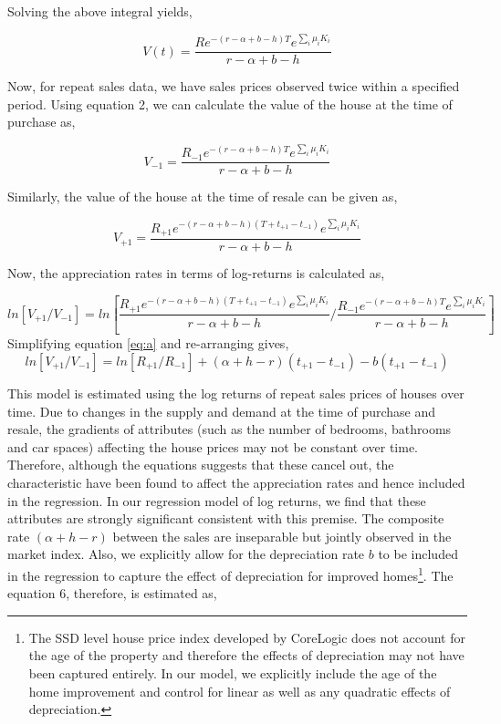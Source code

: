 \documentclass[AEJ,reqno, draftmode]{AEA} %
\begin{document}
Solving the above integral yields,

\begin{equation}
    V(t) = \frac{R e^{-(r-\alpha+b-h)T} e^{\sum_{i} \mu_i K_i}}{r-\alpha+b-h}
\end{equation}

Now, for repeat sales data, we have sales prices observed twice within a specified period. Using equation 2, we can calculate the value of the house at the time of purchase as,

\begin{equation}
    V_{-1} = \frac{R_{-1} e^{-(r-\alpha+b-h)T} e^{\sum_{i} \mu_i K_i}}{r-\alpha+b-h}
\end{equation}

Similarly, the value of the house at the time of resale can be given as,

\begin{equation}
    V_{+1} = \frac{R_{+1} e^{-(r-\alpha+b-h)(T+t_{+1}-t_{-1})} e^{\sum_{i} \mu_i K_i}}{r-\alpha+b-h}
\end{equation}

Now, the appreciation rates in terms of log-returns is calculated as,

\begin{equation} \label{eq:a}
    ln [V_{+1}/V_{-1}] = ln [\frac{R_{+1} e^{-(r-\alpha+b-h)(T+t_{+1}-t_{-1})} e^{\sum_{i} \mu_i K_i}}{r-\alpha+b-h} / \frac{R_{-1} e^{-(r-\alpha+b-h)T} e^{\sum_{i} \mu_i K_i}}{r-\alpha+b-h}]
\end{equation}
Simplifying equation \ref{eq:a} and re-arranging gives,
\begin{equation}
    ln [V_{+1}/V_{-1}] = ln [R_{+1}/R_{-1}] + (\alpha+h-r)(t_{+1}-t_{-1}) - b(t_{+1}-t_{-1}) 
\end{equation}

This model is estimated using the log returns of repeat sales prices of houses over time. Due to changes in the supply and demand at the time of purchase and resale, the gradients of attributes (such as the number of bedrooms, bathrooms and car spaces) affecting the house prices may not be constant over time. Therefore, although the equations suggests that these cancel out, the characteristic have been found to affect the appreciation rates \citep{kiel1995effect} and hence included in the regression. In our regression model of log returns, we find that these attributes are strongly significant consistent with this premise. The composite rate $(\alpha+h-r)$ between the sales are inseparable but jointly observed in the market index. Also, we explicitly allow for the depreciation rate $b$ to be included in the regression to capture the effect of depreciation for improved homes\footnote{The SSD level house price index developed by CoreLogic does not account for the age of the property and therefore the effects of depreciation may not have been captured entirely. In our model, we explicitly include the age of the home improvement and control for linear as well as any quadratic effects of depreciation.}. The equation 6, therefore, is estimated as,
\end{document}
